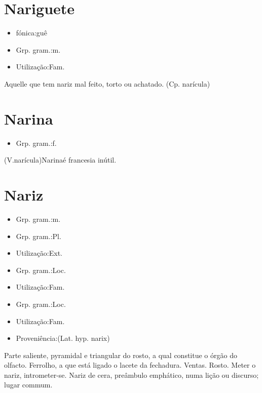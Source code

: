 \section{Nariguete}
\begin{itemize}
\item {fónica:guê}
\end{itemize}
\begin{itemize}
\item {Grp. gram.:m.}
\end{itemize}
\begin{itemize}
\item {Utilização:Fam.}
\end{itemize}
Aquelle que tem nariz mal feito, torto ou achatado.
(Cp. \textunderscore narícula\textunderscore )
\section{Narina}
\begin{itemize}
\item {Grp. gram.:f.}
\end{itemize}
(V.narícula)\textunderscore Narina\textunderscore  é francesia inútil.
\section{Nariz}
\begin{itemize}
\item {Grp. gram.:m.}
\end{itemize}
\begin{itemize}
\item {Grp. gram.:Pl.}
\end{itemize}
\begin{itemize}
\item {Utilização:Ext.}
\end{itemize}
\begin{itemize}
\item {Grp. gram.:Loc.}
\end{itemize}
\begin{itemize}
\item {Utilização:Fam.}
\end{itemize}
\begin{itemize}
\item {Grp. gram.:Loc.}
\end{itemize}
\begin{itemize}
\item {Utilização:Fam.}
\end{itemize}
\begin{itemize}
\item {Proveniência:(Lat. hyp. \textunderscore narix\textunderscore )}
\end{itemize}
Parte saliente, pyramidal e triangular do rosto, a qual constitue o órgão do olfacto.
Ferrolho, a que está ligado o lacete da fechadura.
Ventas.
Rosto.
\textunderscore Meter o nariz\textunderscore , intrometer-se.
\textunderscore Nariz de cera\textunderscore , preâmbulo emphático, numa lição ou discurso; lugar commum.
